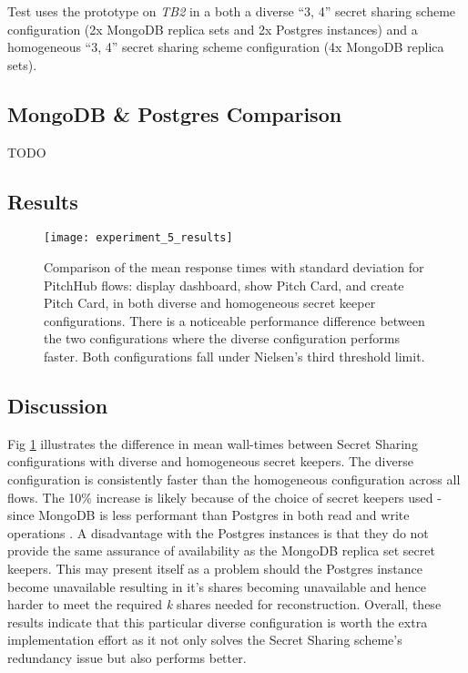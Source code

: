 Test  uses the prototype on \textit{TB2} in a both a diverse ``3, 4'' secret sharing scheme configuration (2x MongoDB replica sets and 2x Postgres instances) and a homogeneous ``3, 4'' secret sharing scheme configuration (4x MongoDB replica sets).

\subsection{MongoDB \& Postgres Comparison}

TODO

\subsection{Results}

\begin{figure}[ht]
    \centering
    \texttt{[image: experiment\_5\_results]}
    \caption{Comparison of the mean response times with standard deviation for PitchHub flows: display dashboard, show Pitch Card, and create Pitch Card, in both diverse and homogeneous secret keeper configurations. There is a noticeable performance difference between the two configurations where the diverse configuration performs faster. Both configurations fall under Nielsen's third threshold limit.}
    \label{fig:test_5_results}
\end{figure}

\subsection{Discussion}
Fig \ref{fig:test_5_results} illustrates the difference in mean wall-times between Secret Sharing configurations with diverse and homogeneous secret keepers. The diverse configuration is consistently faster than the homogeneous configuration across all flows. The 10\% increase is likely because of the choice of secret keepers used - since MongoDB is less performant than Postgres in both read and write operations \cite{van2012sensor}. 
A disadvantage with the Postgres instances is that they do not provide the same assurance of availability as the MongoDB replica set secret keepers. This may present itself as a problem should the Postgres instance become unavailable resulting in it's shares becoming unavailable and hence harder to meet the required \textit{k} shares needed for reconstruction. 
Overall, these results indicate that this particular diverse configuration is worth the extra implementation effort as it not only solves the Secret Sharing scheme's redundancy issue but also performs better. 

